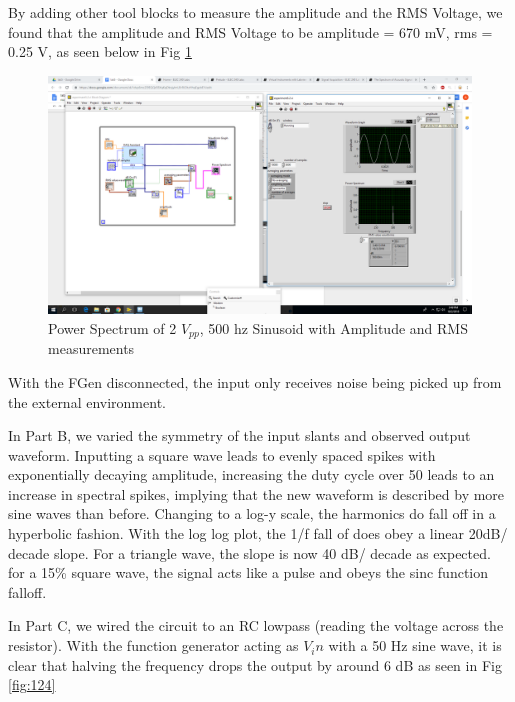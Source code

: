 \documentclass[10pt]{article}
\begin{document}
By adding other tool blocks to measure the amplitude and the RMS Voltage, we found that the amplitude and RMS Voltage to be amplitude = 670 mV, rms = 0.25 V, as seen below in Fig \ref{fig:2vpp500hzextra}

\begin{centering}
	\begin{figure} [H]
		\centering
		\includegraphics[scale=0.22]{images/2vpp500hzwithrmsandamplitude.png}
		\caption{Power Spectrum of 2 $V_{pp}$, 500 hz Sinusoid with Amplitude and RMS measurements}
		\label{fig:2vpp500hzextra}
	\end{figure}
\end{centering}


With the FGen disconnected, the input only receives noise being picked up from the external environment.

In Part B, we varied the symmetry of the input slants and observed output waveform. Inputting a square wave leads to evenly spaced spikes with exponentially decaying amplitude, increasing the duty cycle over 50 leads to an increase in spectral spikes, implying that the new waveform is described by more sine waves than before. Changing to a log-y scale, the harmonics do fall off in a hyperbolic fashion. With the log log plot, the 1/f fall of does obey a linear 20dB/ decade slope. For a triangle wave, the slope is now 40 dB/ decade as expected. for a 15\% square wave, the signal acts like a pulse and obeys the sinc function falloff. 

In Part C, we wired the circuit to an RC lowpass (reading the voltage across the resistor). With the function generator acting as $V_in$ with a 50 Hz sine wave, it is clear that halving the frequency drops the output by around 6 dB as seen in Fig \ref{fig:124}
\end{document}
